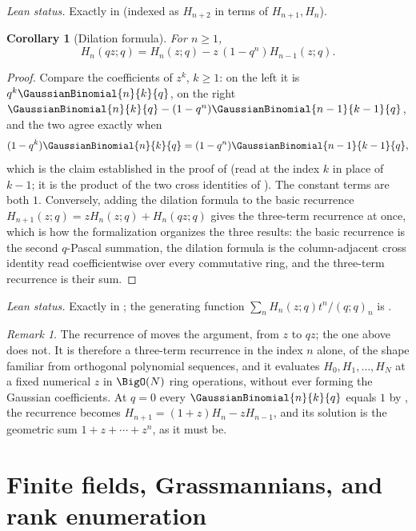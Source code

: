 \documentclass[11pt,a4paper,oneside,openany]{book}
\newtheorem{corollary}[corollary]{Corollary}
\theoremstyle{definition}
\theoremstyle{remark}
\newtheorem{remark}[remark]{Remark}
\begin{document}
\emph{Lean status.}  Exactly  in
 (indexed as $H_{n+2}$ in terms of $H_{n+1},H_n$).


\begin{corollary}[Dilation formula]\label{cor:rogers-szego-dilation}
For $n\ge1$,
\[
 H_n(qz;q)=H_n(z;q)-z\,(1-q^n)H_{n-1}(z;q).
\]
\end{corollary}

\begin{proof}
Compare the coefficients of $z^k$, $k\ge1$: on the left it is $q^k\GaussianBinomial{n}{k}{q}$, on the right $\GaussianBinomial{n}{k}{q}-(1-q^n)\GaussianBinomial{n-1}{k-1}{q}$, and the two agree exactly when
\[
 (1-q^k)\GaussianBinomial{n}{k}{q}=(1-q^n)\GaussianBinomial{n-1}{k-1}{q},
\]
which is the claim established in the proof of  (read at the index $k$ in place of $k-1$; it is the product of the two cross identities of ).  The constant terms are both $1$.  Conversely, adding the dilation formula to the basic recurrence $H_{n+1}(z;q)=zH_n(z;q)+H_n(qz;q)$ gives the three-term recurrence at once, which is how the formalization organizes the three results: the basic recurrence is the second $q$-Pascal summation, the dilation formula is the column-adjacent cross identity read coefficientwise over every commutative ring, and the three-term recurrence is their sum.
\end{proof}

\emph{Lean status.}  Exactly  in
; the generating function $\sum_n H_n(z;q)t^n/(q;q)_n$
is .


\begin{remark}\label{rem:rogers-szego-three-term}
The recurrence of  moves the argument, from
$z$ to $qz$; the one above does not.  It is therefore a three-term recurrence
in the index $n$ alone, of the shape familiar from orthogonal polynomial
sequences, and it evaluates $H_0,H_1,\ldots,H_N$ at a fixed numerical $z$ in
$\BigO(N)$ ring operations, without ever forming the Gaussian coefficients.  At
$q=0$ every $\GaussianBinomial{n}{k}{q}$ equals $1$ by ,
the recurrence becomes $H_{n+1}=(1+z)H_n-zH_{n-1}$, and its solution is the
geometric sum $1+z+\cdots+z^{n}$, as it must be.
\end{remark}

\chapter{Finite fields, Grassmannians, and rank enumeration}\label{chap:finite-geometry}
\end{document}
